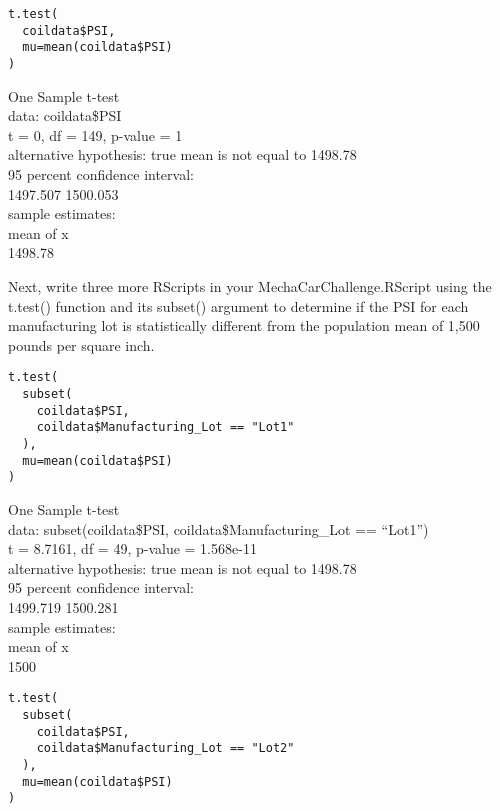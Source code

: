 \documentclass[11pt]{article}
\begin{document}
\begin{verbatim}
t.test(
  coildata$PSI,
  mu=mean(coildata$PSI)
)
\end{verbatim}

\begin{org}


One Sample t-test\\

data:  coildata\$PSI\\
t = 0, df = 149, p-value = 1\\
alternative hypothesis: true mean is not equal to 1498.78\\
95 percent confidence interval:\\
 1497.507 1500.053\\
sample estimates:\\
mean of x\\
  1498.78\\
\end{org}

Next, write three more RScripts in your MechaCarChallenge.RScript using the t.test() function and its subset() argument to determine if the PSI for each manufacturing lot is statistically different from the population mean of 1,500 pounds per square inch.\\

\begin{verbatim}
t.test(
  subset(
    coildata$PSI,
    coildata$Manufacturing_Lot == "Lot1"
  ),
  mu=mean(coildata$PSI)
)
\end{verbatim}

\begin{org}


One Sample t-test\\

data:  subset(coildata\$PSI, coildata\$Manufacturing\_Lot == ``Lot1'')\\
t = 8.7161, df = 49, p-value = 1.568e-11\\
alternative hypothesis: true mean is not equal to 1498.78\\
95 percent confidence interval:\\
 1499.719 1500.281\\
sample estimates:\\
mean of x\\
     1500\\
\end{org}

\begin{verbatim}
t.test(
  subset(
    coildata$PSI,
    coildata$Manufacturing_Lot == "Lot2"
  ),
  mu=mean(coildata$PSI)
)
\end{verbatim}
\end{document}
